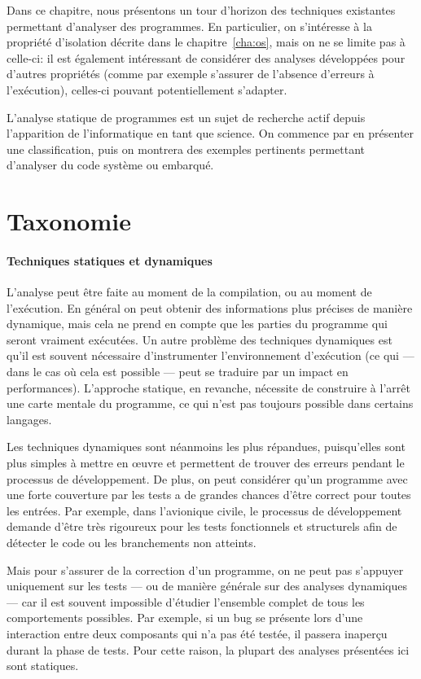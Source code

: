 Dans ce chapitre, nous présentons un tour d'horizon des techniques existantes
permettant d'analyser des programmes. En particulier, on s'intéresse à la
propriété d'isolation décrite dans le chapitre~\ref{cha:os}, mais on ne se
limite pas à celle-ci: il est également intéressant de considérer des analyses
développées pour d'autres propriétés (comme par exemple s'assurer de l'absence
d'erreurs à l'exécution), celles-ci pouvant potentiellement s'adapter.

L'analyse statique de programmes est un sujet de recherche actif depuis
l'apparition de l'informatique en tant que science. On commence par en présenter
une classification, puis on montrera des exemples pertinents permettant
d'analyser du code système ou embarqué.

\section{Taxonomie}

\paragraph{Techniques statiques et dynamiques}

L'analyse peut être faite au moment de la compilation, ou au moment de
l'exécution. En général on peut obtenir des informations plus précises de
manière dynamique, mais cela ne prend en compte que les parties du programme qui
seront vraiment exécutées. Un autre problème des techniques dynamiques est qu'il
est souvent nécessaire d'instrumenter l'environnement d'exécution (ce qui ---
dans le cas où cela est possible --- peut se traduire par un impact en
performances). L'approche statique, en revanche, nécessite de construire à
l'arrêt une carte mentale du programme, ce qui n'est pas toujours possible dans
certains langages.

Les techniques dynamiques sont néanmoins les plus répandues, puisqu'elles sont
plus simples à mettre en œuvre et permettent de trouver des erreurs pendant le
processus de développement. De plus, on peut considérer qu'un programme avec une
forte couverture par les tests a de grandes chances d'être correct pour toutes
les entrées. Par exemple, dans l'avionique civile, le processus de développement
demande d'être très rigoureux pour les tests fonctionnels et structurels afin de
détecter le code ou les branchements non atteints.

Mais pour s'assurer de la correction d'un programme, on ne peut pas s'appuyer
uniquement sur les tests --- ou de manière générale sur des analyses dynamiques
--- car il est souvent impossible d'étudier l'ensemble complet de tous les
comportements possibles. Par exemple, si un bug se présente lors d'une
interaction entre deux composants qui n'a pas été testée, il passera inaperçu
durant la phase de tests. Pour cette raison, la plupart des analyses présentées
ici sont statiques.

